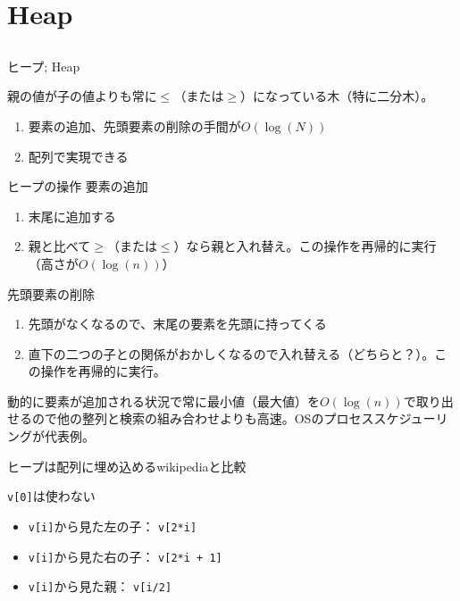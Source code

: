 \documentclass{beamer}
\begin{document}
\section{Heap}		%
\subsection{}

\begin{frame}[fragile]{ヒープ; Heap}{}

親の値が子の値よりも常に$\le$（または$\ge$）になっている木（特に二分木）。

\begin{enumerate}\itemsep8pt
\item 要素の追加、先頭要素の削除の手間が$O(\log(N))$
\item 配列で実現できる
\end{enumerate}
\end{frame}


\begin{frame}[fragile]{ヒープの操作}{}
要素の追加

\begin{enumerate}%
\item 末尾に追加する
\item 親と比べて$\ge$（または$\le$）なら親と入れ替え。この操作を再帰的に実行（高さが$O(\log(n))$）
\end{enumerate}
\vfill
先頭要素の削除
\begin{enumerate}%
\item 先頭がなくなるので、末尾の要素を先頭に持ってくる
\item 直下の二つの子との関係がおかしくなるので入れ替える（どちらと？）。この操作を再帰的に実行。
\end{enumerate}

\vfill
動的に要素が追加される状況で常に最小値（最大値）を$O(\log(n))$で取り出せるので他の整列と検索の組み合わせよりも高速。OSのプロセススケジューリングが代表例。
\end{frame}

\begin{frame}[fragile]{ヒープは配列に埋め込める}{wikipediaと比較}

\begin{center}
\end{center}
\texttt{v[0]}は使わない

\vfill
\begin{itemize}%
\item \texttt{v[i]}から見た左の子： \texttt{v[2*i]}
\item \texttt{v[i]}から見た右の子： \texttt{v[2*i + 1]}
\item \texttt{v[i]}から見た親： \texttt{v[i/2]}
\end{itemize}
\end{frame}
\end{document}
